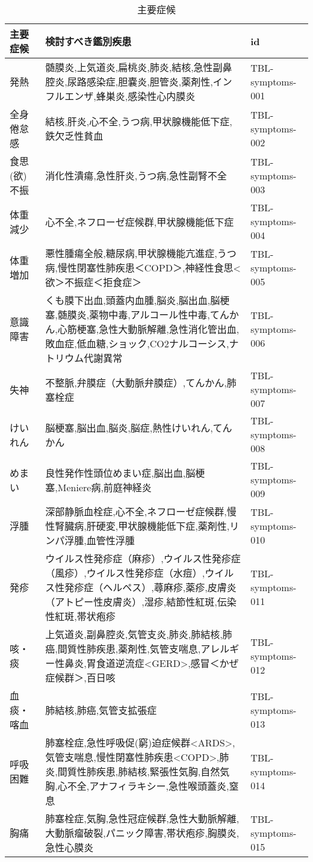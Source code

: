 \begin{xltabular}{\linewidth}{XXX}
\caption{\label{tbl:symptoms}主要症候} \\
\toprule
主要症候 & 検討すべき鑑別疾患 & id \\
\midrule
\endhead
発熱 & 髄膜炎,上気道炎,扁桃炎,肺炎,結核,急性副鼻腔炎,尿路感染症,胆嚢炎,胆管炎,薬剤性,インフルエンザ,蜂巣炎,感染性心内膜炎 & TBL-symptoms-001 \\
全身倦怠感 & 結核,肝炎,心不全,うつ病,甲状腺機能低下症,鉄欠乏性貧血 & TBL-symptoms-002 \\
食思(欲)不振 & 消化性潰瘍,急性肝炎,うつ病,急性副腎不全 & TBL-symptoms-003 \\
体重減少 & 心不全,ネフローゼ症候群,甲状腺機能低下症 & TBL-symptoms-004 \\
体重増加 & 悪性腫瘍全般,糖尿病,甲状腺機能亢進症,うつ病,慢性閉塞性肺疾患＜COPD＞,神経性食思<欲＞不振症＜拒食症＞ & TBL-symptoms-005 \\
意識障害 & くも膜下出血,頭蓋内血腫,脳炎,脳出血,脳梗塞,髄膜炎,薬物中毒,アルコール性中毒,てんかん,心筋梗塞,急性大動脈解離,急性消化管出血,敗血症,低血糖,ショック,CO2ナルコーシス,ナトリウム代謝異常 & TBL-symptoms-006 \\
失神 & 不整脈,弁膜症（大動脈弁膜症）,てんかん,肺塞栓症 & TBL-symptoms-007 \\
けいれん & 脳梗塞,脳出血,脳炎,脳症,熱性けいれん,てんかん & TBL-symptoms-008 \\
めまい & 良性発作性頭位めまい症,脳出血,脳梗塞,Meniere病,前庭神経炎 & TBL-symptoms-009 \\
浮腫 & 深部静脈血栓症,心不全,ネフローゼ症候群,慢性腎臓病,肝硬変,甲状腺機能低下症,薬剤性,リンパ浮腫,血管性浮腫 & TBL-symptoms-010 \\
発疹 & ウイルス性発疹症（麻疹）,ウイルス性発疹症（風疹）,ウイルス性発疹症（水痘）,ウイルス性発疹症（ヘルペス）,蕁麻疹,薬疹,皮膚炎（アトピー性皮膚炎）,湿疹,結節性紅斑,伝染性紅斑,帯状疱疹 & TBL-symptoms-011 \\
咳・痰 & 上気道炎,副鼻腔炎,気管支炎,肺炎,肺結核,肺癌,間質性肺疾患,薬剤性,気管支喘息,アレルギー性鼻炎,胃食道逆流症<GERD>,感冒＜かぜ症候群＞,百日咳 & TBL-symptoms-012 \\
血痰・喀血 & 肺結核,肺癌,気管支拡張症 & TBL-symptoms-013 \\
呼吸困難 & 肺塞栓症,急性呼吸促(窮)迫症候群<ARDS>,気管支喘息,慢性閉塞性肺疾患<COPD>,肺炎,間質性肺疾患,肺結核,緊張性気胸,自然気胸,心不全,アナフィラキシー,急性喉頭蓋炎,窒息 & TBL-symptoms-014 \\
胸痛 & 肺塞栓症,気胸,急性冠症候群,急性大動脈解離,大動脈瘤破裂,パニック障害,帯状疱疹,胸膜炎,急性心膜炎 & TBL-symptoms-015 \\

\end{xltabular}
